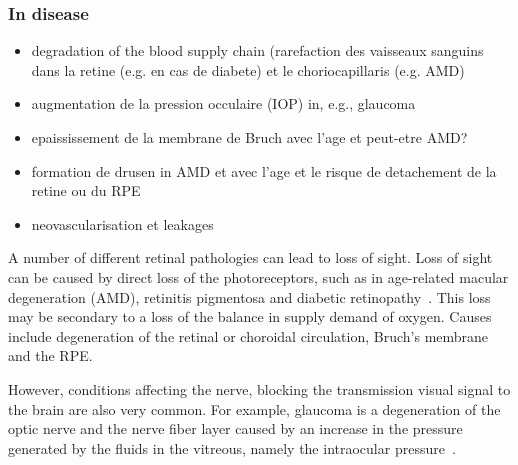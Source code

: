 \documentclass[12pt,a4paper]{journal}
\begin{document}
\subsubsection{In disease}

\begin{itemize}
\item degradation of the blood supply chain (rarefaction des vaisseaux sanguins dans la retine (e.g. en cas de diabete) et le choriocapillaris (e.g. AMD)
\item augmentation de la pression occulaire (IOP) in, e.g., glaucoma
\item epaississement de la membrane de Bruch avec l'age et peut-etre AMD?
\item formation de drusen in AMD et avec l'age et le risque de detachement de la retine ou du RPE
\item neovascularisation et leakages
\end{itemize}

A number of different retinal pathologies can lead to loss of sight.
Loss of sight can be caused by direct loss of the photoreceptors, such as in age-related macular degeneration (AMD), retinitis pigmentosa and diabetic retinopathy~\cite{Gupta_2015, Birch_1999}.
This loss may be secondary to a loss of the balance in supply demand of oxygen.
Causes include degeneration of the retinal or choroidal circulation, Bruch's membrane and the RPE.


However, conditions affecting the nerve, blocking the transmission visual signal to the brain are also very common.
For example, glaucoma is a degeneration of the optic nerve and the nerve fiber layer caused by an increase in the pressure generated by the fluids in the vitreous, namely the intraocular pressure~\cite{Quigley_2011}.


{\normalsize }
\end{document}
